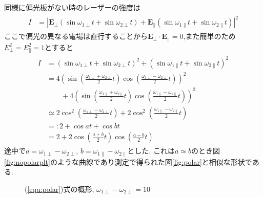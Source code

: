 同様に偏光板がない時のレーザーの強度は
\begin{align}
  \begin{split}
    I&=|\bm{E}_\perp(\sin\omega_{1\perp}t+\sin\omega_{2\perp}t)+\bm{E}_\parallel(\sin\omega_{1\parallel}t+\sin\omega_{2\parallel}t)|^2
  \end{split}
\end{align}
ここで偏光の異なる電場は直行することから$\bm{E}_\perp\cdot\bm{E}_\parallel=0$,また簡単のため$E_\perp^2=E_\parallel^2=1$とすると
\begin{align}
  \begin{split}
    \label{equ:nopolar}
    I&=(\sin\omega_{1\perp}t+\sin\omega_{2\perp}t)^2+(\sin\omega_{1\parallel}t+\sin\omega_{2\parallel}t)^2\\
    &=4\left(\sin\left(\frac{\omega_{1\perp}+\omega_{2\perp}}{2}t\right)\cos\left(\frac{\omega_{1\perp}-\omega_{2\perp}}{2}t\right)\right)^2\\
    &\qquad+4\left(\sin\left(\frac{\omega_{1\parallel}+\omega_{2\parallel}}{2}t\right)\cos\left(\frac{\omega_{1\parallel}-\omega_{2\parallel}}{2}t\right)\right)^2\\
    &\simeq2\cos^2\left(\frac{\omega_{1\perp}-\omega_{2\perp}}{2}t\right)+2\cos^2\left(\frac{\omega_{1\parallel}-\omega_{2\parallel}}{2}t\right)\\
    &=:2+\cos at+\cos bt\\
    &=2+2\cos\left(\frac{a+b}{2}t\right)\cos\left(\frac{a-b}{2}t\right)
  \end{split}
\end{align}
途中で$a=\omega_{1\perp}-\omega_{2\perp}$, $b=\omega_{1\parallel}-\omega_{2\parallel}$とした.
これは$a\simeq b$のとき図\ref{fig:nopolarplt}のような曲線であり測定で得られた図\ref{fig:polar}と相似な形状である.

\begin{figure}[htbp]
  \begin{center}
  \end{center}
  \caption{(\ref{equ:polar})式の概形, $\omega_{1\perp}-\omega_{2\perp}=10$}
  \label{fig:polarplt}
\end{figure}

